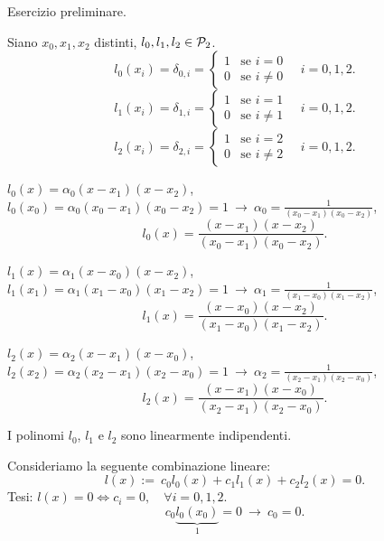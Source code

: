 \begin{ese}
Esercizio preliminare.

Siano $x_0, x_1, x_2$ distinti, $l_0, l_1, l_2 \in \mathcal{P}_2$.
\[
l_0(x_i) = \delta_{0,i} = \left\{\begin{array}{lr}
1 & \textrm{se } i = 0 \\
0 & \textrm{se } i \neq 0
\end{array}\right. \quad i = 0, 1, 2.
\]
\[
l_1(x_i) = \delta_{1,i} = \left\{\begin{array}{lr}
1 & \textrm{se } i = 1 \\
0 & \textrm{se } i \neq 1
\end{array}\right. \quad i = 0, 1, 2.
\]
\[
l_2(x_i) = \delta_{2,i} = \left\{\begin{array}{lr}
1 & \textrm{se } i = 2 \\
0 & \textrm{se } i \neq 2
\end{array}\right. \quad i = 0, 1, 2.
\]
\begin{flushleft}
$l_0(x) = \alpha_0(x-x_1)(x-x_2)$,\\
$l_0(x_0) = \alpha_0(x_0-x_1)(x_0-x_2) = 1\ \longrightarrow\ \alpha_0 =
\frac{1}{(x_0-x_1)(x_0-x_2)}$,\\
\[l_0(x) =\frac{(x-x_1)(x-x_2)}{(x_0-x_1)(x_0-x_2)}.\]
\end{flushleft}
\begin{flushleft}
$l_1(x) = \alpha_1(x-x_0)(x-x_2)$,\\
$l_1(x_1) = \alpha_1(x_1-x_0)(x_1-x_2) = 1\ \longrightarrow\ \alpha_1 =
\frac{1}{(x_1-x_0)(x_1-x_2)}$,\\
\[l_1(x) =\frac{(x-x_0)(x-x_2)}{(x_1-x_0)(x_1-x_2)}.\]
\end{flushleft}
\begin{flushleft}
$l_2(x) = \alpha_2(x-x_1)(x-x_0)$,\\
$l_2(x_2) = \alpha_2(x_2-x_1)(x_2-x_0) = 1\ \longrightarrow\ \alpha_2 =
\frac{1}{(x_2-x_1)(x_2-x_0)}$,\\
\[l_2(x) =\frac{(x-x_1)(x-x_0)}{(x_2-x_1)(x_2-x_0)}.\]
\end{flushleft}
\begin{prop}
I polinomi $l_0$, $l_1$ e $l_2$ sono linearmente indipendenti.
\end{prop}
\begin{dimo}
Consideriamo la seguente combinazione lineare:
\[l(x) := \ c_0l_0(x) + c_1l_1(x) + c_2l_2(x) = 0.\]
Tesi: $l(x) = 0 \Longleftrightarrow c_i = 0, \quad \forall i = 0,1,2$.
\[c_0\underbrace{l_0(x_0)}_{1} = 0\ \longrightarrow\ c_0=0.\]

\end{dimo}
\end{ese}
